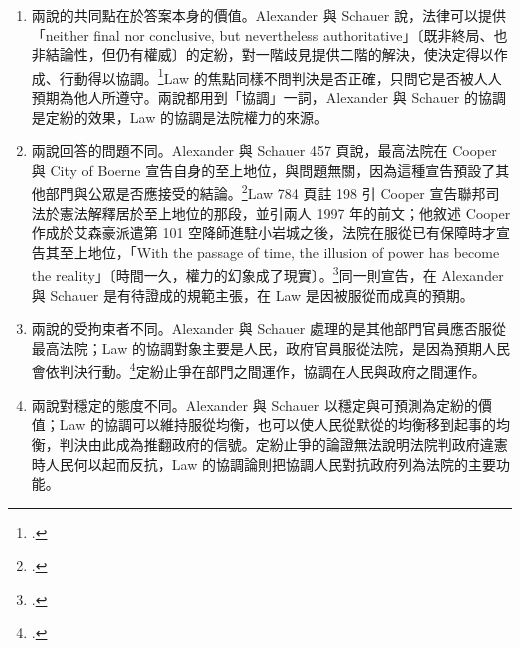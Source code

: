 \begin{enumerate}
\tightlist
\item
  兩說的共同點在於答案本身的價值。Alexander 與 Schauer 說，法律可以提供「neither final nor conclusive, but nevertheless authoritative」〔既非終局、也非結論性，但仍有權威〕的定紛，對一階歧見提供二階的解決，使決定得以作成、行動得以協調。\footcite[467]{alexander2000}Law 的焦點同樣不問判決是否正確，只問它是否被人人預期為他人所遵守。兩說都用到「協調」一詞，Alexander 與 Schauer 的協調是定紛的效果，Law 的協調是法院權力的來源。
\item
  兩說回答的問題不同。Alexander 與 Schauer 457 頁說，最高法院在 Cooper 與 City of Boerne 宣告自身的至上地位，與問題無關，因為這種宣告預設了其他部門與公眾是否應接受的結論。\footcite[457]{alexander2000}Law 784 頁註 198 引 Cooper 宣告聯邦司法於憲法解釋居於至上地位的那段，並引兩人 1997 年的前文；他敘述 Cooper 作成於艾森豪派遣第 101 空降師進駐小岩城之後，法院在服從已有保障時才宣告其至上地位，「With the passage of time, the illusion of power has become the reality」〔時間一久，權力的幻象成了現實〕。\footcite[784--785 \& n.198]{law2009}同一則宣告，在 Alexander 與 Schauer 是有待證成的規範主張，在 Law 是因被服從而成真的預期。
\item
  兩說的受拘束者不同。Alexander 與 Schauer 處理的是其他部門官員應否服從最高法院；Law 的協調對象主要是人民，政府官員服從法院，是因為預期人民會依判決行動。\footcite[794]{law2009}定紛止爭在部門之間運作，協調在人民與政府之間運作。
\item
  兩說對穩定的態度不同。Alexander 與 Schauer 以穩定與可預測為定紛的價值；Law 的協調可以維持服從均衡，也可以使人民從默從的均衡移到起事的均衡，判決由此成為推翻政府的信號。定紛止爭的論證無法說明法院判政府違憲時人民何以起而反抗，Law 的協調論則把協調人民對抗政府列為法院的主要功能。
\end{enumerate}
